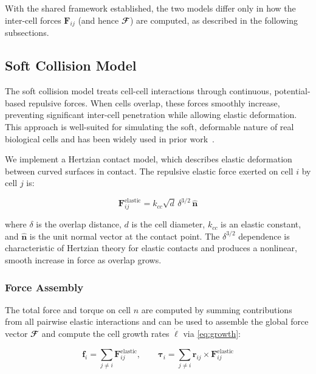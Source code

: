 \documentclass[a4paper,fleqn]{cas-dc}
\begin{document}
With the shared framework established, the two models differ only in how the inter-cell forces $\mathbf{F}_{ij}$ (and hence $\mathbfcal{F}$) are computed, as described in the following subsections.

\subsection{Soft Collision Model}

The soft collision model treats cell-cell interactions through continuous, potential-based repulsive forces. When cells overlap, these forces smoothly increase, preventing significant inter-cell penetration while allowing elastic deformation. This approach is well-suited for simulating the soft, deformable nature of real biological cells and has been widely used in prior work~\cite{Warren2019, You2018,Blanchard2015,Ghosh2015,Khan_2024,You_2021,Valdez2025,Rudge2013,Langeslay_2023}.

We implement a Hertzian contact model, which describes elastic deformation between curved surfaces in contact. The repulsive elastic force exerted on cell $i$ by cell $j$ is:

\begin{equation} \label{eq:hertzian_contact_model}
    \mathbf{F}^{\text{elastic}}_{ij} = k_{cc} \sqrt{d} \, \delta^{3/2} \, \hat{\mathbf{n}}
\end{equation}

where $\delta$ is the overlap distance, $d$ is the cell diameter, $k_{cc}$ is an elastic constant, and $\hat{\mathbf{n}}$ is the unit normal vector at the contact point. The $\delta^{3/2}$ dependence is characteristic of Hertzian theory for elastic contacts and produces a nonlinear, smooth increase in force as overlap grows.

\subsubsection{Force Assembly}

The total force and torque on cell $n$ are computed by summing contributions from all pairwise elastic interactions and can be used to assemble the global force vector $\mathbfcal{F}$ and compute the cell growth rates $\dot{\boldsymbol{\ell}}$ via \autoref{eq:growth}:

\begin{equation} \label{eq:force_assembly}
    \mathbf{f}_i         = \sum_{j \neq i} \mathbf{F}^{\text{elastic}}_{ij}, \qquad
    \boldsymbol{\tau}_i  = \sum_{j \neq i} \mathbf{r}_{ij} \times \mathbf{F}^{\text{elastic}}_{ij}
\end{equation}
\end{document}
